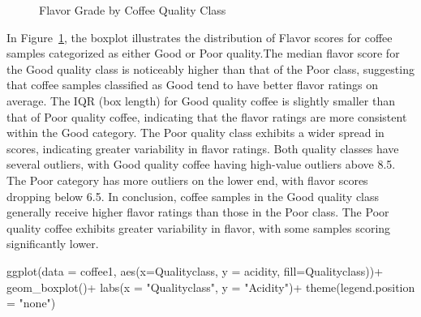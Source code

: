 \documentclass[
  letterpaper,
  DIV=11,
  numbers=noendperiod]{scrartcl}
\newenvironment{Shaded}{\begin{snugshade}}{\end{snugshade}}
\newcommand{\AttributeTok}[1]{\textcolor[rgb]{0.40,0.45,0.13}{#1}}
\newcommand{\FunctionTok}[1]{\textcolor[rgb]{0.28,0.35,0.67}{#1}}
\newcommand{\NormalTok}[1]{\textcolor[rgb]{0.00,0.23,0.31}{#1}}
\newcommand{\SpecialCharTok}[1]{\textcolor[rgb]{0.37,0.37,0.37}{#1}}
\newcommand{\StringTok}[1]{\textcolor[rgb]{0.13,0.47,0.30}{#1}}
\begin{document}
\begin{figure}[H]


\caption{\label{fig-boxplot2}Flavor Grade by Coffee Quality Class}

\end{figure}%

In Figure~\ref{fig-boxplot2}, the boxplot illustrates the distribution
of Flavor scores for coffee samples categorized as either Good or Poor
quality.The median flavor score for the Good quality class is noticeably
higher than that of the Poor class, suggesting that coffee samples
classified as Good tend to have better flavor ratings on average. The
IQR (box length) for Good quality coffee is slightly smaller than that
of Poor quality coffee, indicating that the flavor ratings are more
consistent within the Good category. The Poor quality class exhibits a
wider spread in scores, indicating greater variability in flavor
ratings. Both quality classes have several outliers, with Good quality
coffee having high-value outliers above 8.5. The Poor category has more
outliers on the lower end, with flavor scores dropping below 6.5. In
conclusion, coffee samples in the Good quality class generally receive
higher flavor ratings than those in the Poor class. The Poor quality
coffee exhibits greater variability in flavor, with some samples scoring
significantly lower.

\begin{Shaded}
\begin{Highlighting}[]
\FunctionTok{ggplot}\NormalTok{(}\AttributeTok{data =}\NormalTok{ coffee1, }\FunctionTok{aes}\NormalTok{(}\AttributeTok{x=}\NormalTok{Qualityclass, }
                           \AttributeTok{y =}\NormalTok{ acidity, }
                           \AttributeTok{fill=}\NormalTok{Qualityclass))}\SpecialCharTok{+}
  \FunctionTok{geom\_boxplot}\NormalTok{()}\SpecialCharTok{+}
  \FunctionTok{labs}\NormalTok{(}\AttributeTok{x =} \StringTok{"Qualityclass"}\NormalTok{, }\AttributeTok{y =} \StringTok{"Acidity"}\NormalTok{)}\SpecialCharTok{+}
  \FunctionTok{theme}\NormalTok{(}\AttributeTok{legend.position =} \StringTok{"none"}\NormalTok{)}
\end{Highlighting}
\end{Shaded}
\end{document}
